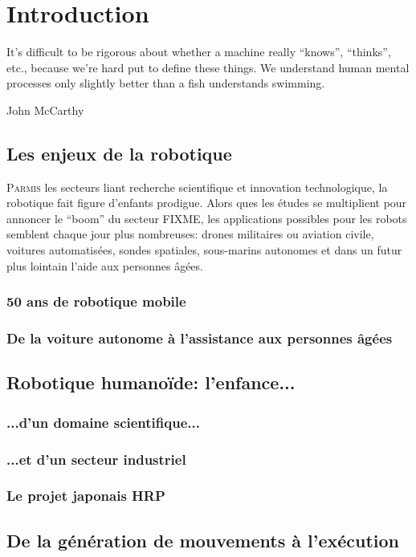 \chapter{Introduction}\label{chap:chap0}

\epigraph{It's difficult to be rigorous about whether a machine really
  ``knows'', ``thinks'', etc., because we're hard put to define these
  things. We understand human mental processes only slightly better
  than a fish understands swimming.}{John McCarthy}
\clearpage

\section{Les enjeux de la robotique}

\lettrine[lines=2, lraise=0.1, nindent=0em, slope=-.5em]%
{P}{armis} les secteurs liant recherche scientifique et innovation
technologique, la robotique fait figure d'enfants prodigue. Alors ques
les études se multiplient pour annoncer le ``boom'' du secteur FIXME,
les applications possibles pour les robots semblent chaque jour plus
nombreuses: drones militaires ou aviation civile, voitures
automatisées, sondes spatiales, sous-marins autonomes et dans un futur
plus lointain l'aide aux personnes âgées.

\subsection{50 ans de robotique mobile}
\subsection{De la voiture autonome à l'assistance aux personnes âgées}

\section{Robotique humanoïde: l'enfance...}

\subsection{...d'un domaine scientifique...}
\subsection{...et d'un secteur industriel}

\subsection{Le projet japonais HRP}

\section{De la génération de mouvements à l'exécution}

